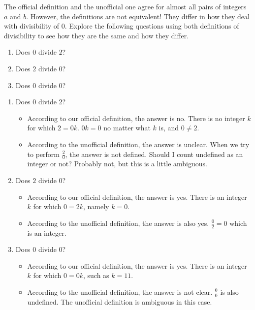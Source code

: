 The official definition and the unofficial one agree for almost all pairs of integers $a$ and $b$.  However, the definitions are not equivalent!  They differ in how they deal with divisibility of $0$.  Explore the following questions using both definitions of divisibility to see how they are the same and how they differ.

\begin{xca}
	\begin{enumerate}
	\item Does $0$ divide $2$?  
	\item Does $2$ divide $0$?  
	\item Does $0$ divide $0$?
	\end{enumerate}
\end{xca}

\begin{solutions}
	\begin{enumerate}
		\item Does $0$ divide $2$?
		
		\begin{itemize}
			\item According to our official definition, the answer is no.  There is no integer $k$ for which $2 = 0k$.  $0k = 0$ no matter what $k$ is, and $0 \neq 2$.
			\item According to the unofficial definition, the answer is unclear.  When we try to perform $\frac{2}{0}$, the answer is not defined.  Should I count undefined as an integer or not?  Probably not, but this is a little ambiguous.
			\end{itemize}
		\item Does $2$ divide $0$? 
		
		\begin{itemize}
			\item According to our official definition, the answer is yes.  There is an integer $k$ for which $0 = 2k$, namely $k=0$.
			\item According to the unofficial definition, the answer is also yes.  $\frac{0}{2} = 0$ which is an integer.
			\end{itemize}
		\item Does $0$ divide $0$? 
				\begin{itemize}
			\item According to our official definition, the answer is yes.  There is an integer $k$ for which $0 = 0k$, such as $k=11$.
			\item According to the unofficial definition, the answer is not clear.  $\frac{0}{0}$ is also undefined.  The unofficial definition is ambiguous in this case.
		\end{itemize}
	\end{enumerate}
\end{solutions}

